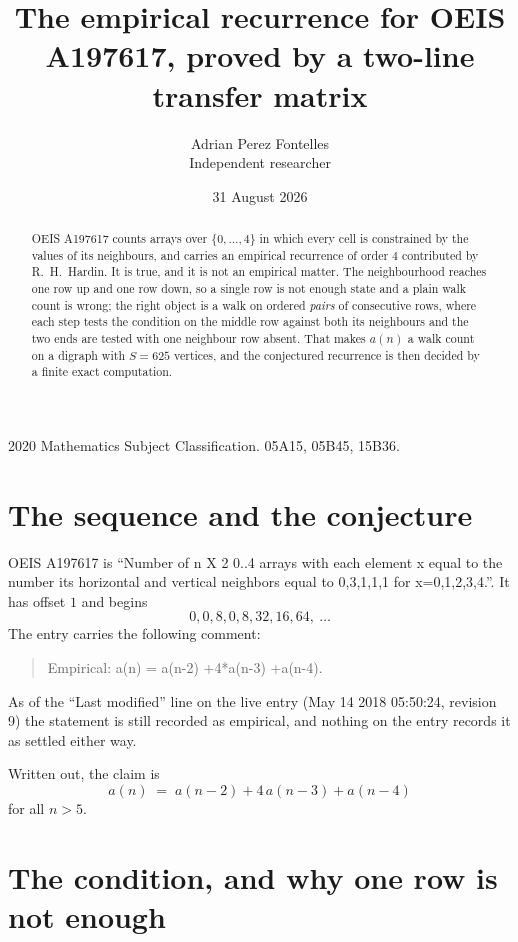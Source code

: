 \documentclass[11pt,a4paper]{article}
\title{The empirical recurrence for OEIS A197617, proved by a two-line transfer matrix}
\author{Adrian Perez Fontelles\\ \small Independent researcher}
\date{31 August 2026}
\theoremstyle{plain}
\theoremstyle{definition}
\begin{document}
\maketitle

\begin{abstract}
OEIS A197617 counts arrays over $\{0,\dots,4\}$ in which every cell is constrained by the
values of its neighbours, and carries an empirical recurrence of order $4$ contributed
by R.~H.~Hardin. It is true, and it is not an empirical matter. The neighbourhood reaches one
row up and one row down, so a single row is not enough state and a plain walk count
is wrong; the right object is a walk on ordered \emph{pairs} of consecutive rows, where
each step tests the condition on the middle row against both its neighbours and the two
ends are tested with one neighbour row absent. That makes $a(n)$ a walk count on a digraph
with $S=625$ vertices, and the conjectured recurrence is then decided by a finite exact
computation.
\end{abstract}

\noindent\small 2020 Mathematics Subject Classification. 05A15, 05B45, 15B36.\normalsize

\section{The sequence and the conjecture}

OEIS A197617 is ``Number of n X 2 0..4 arrays with each element x equal to the number its horizontal and vertical neighbors equal to 0,3,1,1,1 for x=0,1,2,3,4.''. It has offset $1$ and begins
\[
0, 0, 8, 0, 8, 32, 16, 64,\ \dots
\]
The entry carries the following comment:
\begin{quote}\small
Empirical: a(n) = a(n-2) +4*a(n-3) +a(n-4).
\end{quote}
As of the ``Last modified'' line on the live entry (May 14 2018 05:50:24, revision 9) the statement is
still recorded as empirical, and nothing on the entry records it as settled either way.

Written out, the claim is
\begin{equation}\label{eq:conj}
a(n)\;=\;a(n-2) + 4\,a(n-3) + a(n-4)
\end{equation}
for all $n>5$.

\section{The condition, and why one row is not enough}
\end{document}
